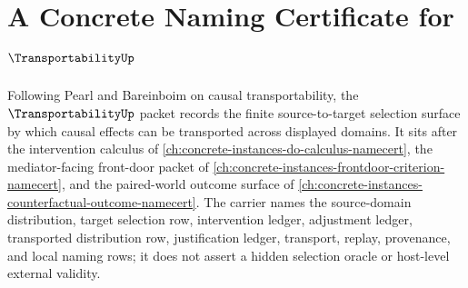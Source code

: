 \chapter{A Concrete Naming Certificate for $\TransportabilityUp$}
\label{ch:concrete-instances-transportability-namecert}

Following Pearl and Bareinboim on causal transportability, the $\TransportabilityUp$ packet records the finite source-to-target selection surface by which causal effects can be transported across displayed domains. It sits after the intervention calculus of \autoref{ch:concrete-instances-do-calculus-namecert}, the mediator-facing front-door packet of \autoref{ch:concrete-instances-frontdoor-criterion-namecert}, and the paired-world outcome surface of \autoref{ch:concrete-instances-counterfactual-outcome-namecert}. The carrier names the source-domain distribution, target selection row, intervention ledger, adjustment ledger, transported distribution row, justification ledger, transport, replay, provenance, and local naming rows; it does not assert a hidden selection oracle or host-level external validity.


